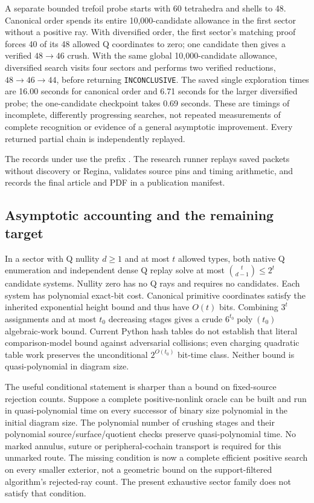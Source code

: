 A separate bounded trefoil probe starts with 60 tetrahedra and shells to
48.  Canonical order spends its entire 10,000-candidate allowance in the
first sector without a positive ray.  With diversified order, the first
sector's matching proof forces 40 of its 48 allowed Q coordinates to zero;
one candidate then gives a verified $48\to46$ crush.  With the same global
10,000-candidate allowance, diversified search visits four sectors and
performs two verified reductions, $48\to46\to44$, before returning
\texttt{INCONCLUSIVE}.  The saved single exploration times are 16.00
seconds for canonical order and 6.71 seconds for the larger diversified
probe; the one-candidate checkpoint takes 0.69 seconds.  These are timings
of incomplete, differently progressing searches, not repeated measurements
of complete recognition or evidence of a general asymptotic improvement.
Every returned partial chain is independently replayed.

The records under  use the prefix
.  The research runner 
replays saved packets
without discovery or Regina, validates source pins and timing arithmetic,
and records the final article and PDF in a publication manifest.

\subsection{Asymptotic accounting and the remaining target}

In a sector with Q nullity $d\geq1$ and at most $t$ allowed types, both native
Q enumeration and independent dense Q replay solve at most
$\binom{t}{d-1}\leq2^t$ candidate systems.  Nullity zero has no Q rays
and requires no candidates.  Each system has polynomial exact-bit
cost.  Canonical primitive coordinates satisfy the inherited exponential
height bound and thus have $O(t)$ bits.  Combining $3^t$ assignments and at
most $t_0$ decreasing stages gives a crude $6^{t_0}\operatorname{poly}(t_0)$
algebraic-work bound.  Current Python hash tables do not establish that
literal comparison-model bound against adversarial collisions; even charging
quadratic table work preserves the unconditional $2^{O(t_0)}$ bit-time class.
Neither bound is quasi-polynomial in diagram size.

The useful conditional statement is sharper than a bound on fixed-source
rejection counts.  Suppose a complete positive-nonlink oracle can be built
and run in quasi-polynomial time on every successor of binary size polynomial
in the initial diagram size.  The polynomial number of crushing stages and
their polynomial source/surface/quotient checks preserve quasi-polynomial
time.  No marked annulus, suture or peripheral-cochain transport is required
for this unmarked route.  The missing condition is now a complete efficient
positive search on every smaller exterior, not a geometric bound on the
support-filtered algorithm's rejected-ray count.  The present exhaustive
sector family does not satisfy that condition.
